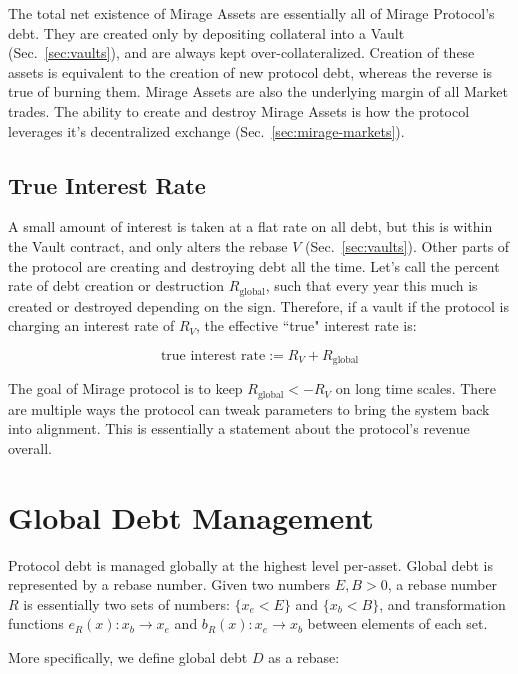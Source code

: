 \documentclass[letterpaper]{article}
\begin{document}
\begin{multicols}{2}
The total net existence of Mirage Assets are essentially all of Mirage Protocol's debt. They are created only by depositing collateral into a Vault (Sec.~\ref{sec:vaults}), and are always kept over-collateralized. Creation of these assets is equivalent to the creation of new protocol debt, whereas the reverse is true of burning them. Mirage Assets are also the underlying margin of all Market trades. The ability to create and destroy Mirage Assets is how the protocol leverages it's decentralized exchange (Sec.~\ref{sec:mirage-markets}). 


\subsection{True Interest Rate}

A small amount of interest is taken at a flat rate on all debt, but this is within the Vault contract, and only alters the rebase $V$ (Sec.~\ref{sec:vaults}). Other parts of the protocol are creating and destroying debt all the time. Let's call the percent rate of debt creation or destruction $R_{\text{global}}$, such that every year this much is created or destroyed depending on the sign. Therefore, if a vault if the protocol is charging an interest rate of $R_V$, the effective ``true" interest rate is:

\begin{equation}
    \text{true interest rate} := R_V + R_{\text{global}}
\end{equation}

The goal of Mirage protocol is to keep $R_{\text{global}} < -R_V$ on long time scales. There are multiple ways the protocol can tweak parameters to bring the system back into alignment. This is essentially a statement about the protocol's revenue overall.




\section{Global Debt Management}

Protocol debt is managed globally at the highest level per-asset. Global debt is represented by a rebase number. Given two numbers $E, B > 0$, a rebase number $R$ is essentially two sets of numbers: $\{x_e < E\}$ and $\{x_b < B\}$, and transformation functions $e_R(x): x_b \rightarrow x_e$ and $b_R(x): x_e \rightarrow x_b$ between elements of each set.

More specifically, we define global debt $D$ as a rebase:


\end{multicols}
\end{document}
